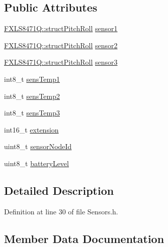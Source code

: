 \subsection*{Public Attributes}
\begin{DoxyCompactItemize}
\item 
\hyperlink{struct_f_x_l_s8471_q_1_1struct_pitch_roll}{F\+X\+L\+S8471\+Q\+::struct\+Pitch\+Roll} \hyperlink{struct_sensors_1_1struct_sensors_a66081d2159f5f6025ec91d1ca0b5f929}{sensor1}
\item 
\hyperlink{struct_f_x_l_s8471_q_1_1struct_pitch_roll}{F\+X\+L\+S8471\+Q\+::struct\+Pitch\+Roll} \hyperlink{struct_sensors_1_1struct_sensors_ac5e48ff6594a92be5bafad0fd1c2a1b7}{sensor2}
\item 
\hyperlink{struct_f_x_l_s8471_q_1_1struct_pitch_roll}{F\+X\+L\+S8471\+Q\+::struct\+Pitch\+Roll} \hyperlink{struct_sensors_1_1struct_sensors_a83cf8dccb4cdd9793eccfe22bf700182}{sensor3}
\item 
int8\+\_\+t \hyperlink{struct_sensors_1_1struct_sensors_abed58bc62187a31307dfae2fb9303072}{sens\+Temp1}
\item 
int8\+\_\+t \hyperlink{struct_sensors_1_1struct_sensors_a5b3086768c0be51c00c8bf8f3df4c9a8}{sens\+Temp2}
\item 
int8\+\_\+t \hyperlink{struct_sensors_1_1struct_sensors_aa3f563131986d4d3551e6889dd7b4b3b}{sens\+Temp3}
\item 
int16\+\_\+t \hyperlink{struct_sensors_1_1struct_sensors_a11872d348bb506ddb714386c7897b120}{extension}
\item 
uint8\+\_\+t \hyperlink{struct_sensors_1_1struct_sensors_aab40fd3e3c8f0086b7b80d8cbb1e80cb}{sensor\+Node\+Id}
\item 
uint8\+\_\+t \hyperlink{struct_sensors_1_1struct_sensors_a11658e45b96b1e9dc746562585fe8aa0}{battery\+Level}
\end{DoxyCompactItemize}


\subsection{Detailed Description}


Definition at line 30 of file Sensors.\+h.



\subsection{Member Data Documentation}
